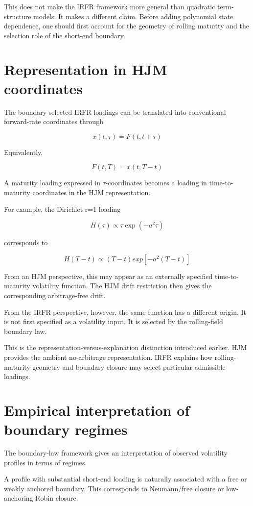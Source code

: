 \documentclass[11pt,oneside]{book}
\begin{document}
This does not make the IRFR framework more general than quadratic
term-structure models. It makes a different claim. Before adding
polynomial state dependence, one should first account for the geometry
of rolling maturity and the selection role of the short-end boundary.

\section{Representation in HJM
coordinates}\label{representation-in-hjm-coordinates}

The boundary-selected IRFR loadings can be translated into conventional
forward-rate coordinates through

\[
x(t,\tau) = F(t,t+\tau)
\]

Equivalently,

\[
F(t,T) = x(t,T-t)
\]

A maturity loading expressed in $\tau$-coordinates becomes a loading in
time-to-maturity coordinates in the HJM representation.

For example, the Dirichlet r=1 loading

\[
H(\tau) \propto \tau \exp(-a^2\tau)
\]

corresponds to

\[
H(T-t) \propto (T-t) exp[-a^2(T-t)]
\]

From an HJM perspective, this may appear as an externally specified
time-to-maturity volatility function. The HJM drift restriction then
gives the corresponding arbitrage-free drift.

From the IRFR perspective, however, the same function has a different
origin. It is not first specified as a volatility input. It is selected
by the rolling-field boundary law.

This is the representation-versus-explanation distinction introduced
earlier. HJM provides the ambient no-arbitrage representation. IRFR
explains how rolling-maturity geometry and boundary closure may select
particular admissible loadings.

\section{Empirical interpretation of boundary
regimes}\label{empirical-interpretation-of-boundary-regimes}

The boundary-law framework gives an interpretation of observed
volatility profiles in terms of regimes.

A profile with substantial short-end loading is naturally associated
with a free or weakly anchored boundary. This corresponds to
Neumann/free closure or low-anchoring Robin closure.
\end{document}

